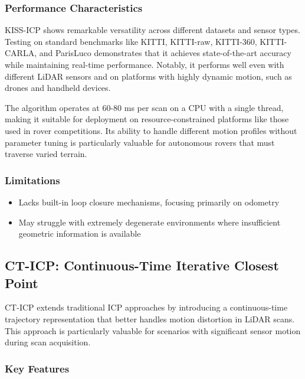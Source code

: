 \documentclass[journal]{IEEEtran}
\begin{document}
\subsubsection{Performance Characteristics} 

KISS-ICP shows remarkable versatility across different datasets and sensor types. Testing on standard benchmarks like KITTI, KITTI-raw, KITTI-360, KITTI-CARLA, and ParisLuco demonstrates that it achieves state-of-the-art accuracy while maintaining real-time performance. Notably, it performs well even with different LiDAR sensors and on platforms with highly dynamic motion, such as drones and handheld devices.

The algorithm operates at 60-80 ms per scan on a CPU with a single thread, making it suitable for deployment on resource-constrained platforms like those used in rover competitions. Its ability to handle different motion profiles without parameter tuning is particularly valuable for autonomous rovers that must traverse varied terrain.

\subsubsection{Limitations}

\begin{itemize}
    \item Lacks built-in loop closure mechanisms, focusing primarily on odometry
    \item May struggle with extremely degenerate environments where insufficient geometric information is available
\end{itemize}

\subsection{CT-ICP: Continuous-Time Iterative Closest Point}

CT-ICP extends traditional ICP approaches by introducing a continuous-time trajectory representation that better handles motion distortion in LiDAR scans. This approach is particularly valuable for scenarios with significant sensor motion during scan acquisition.

\subsubsection{Key Features}
\end{document}
